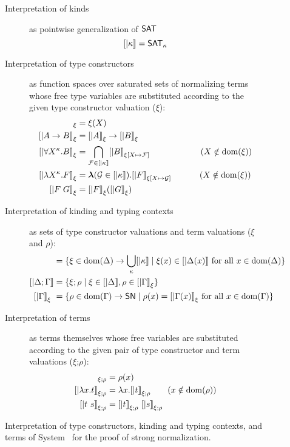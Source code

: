 \begin{figure}
\begin{singlespace}
\begin{description}
\item[Interpretation of kinds] as pointwise generalization of $\mathsf{SAT}$
        \[ [| \kappa |] = \mathsf{SAT}_\kappa \]
\item[Interpretation of type constructors]
        as function spaces over saturated sets of normalizing terms
        whose free type variables are substituted according to
        the given type constructor valuation ($\xi$):
\begin{align*}
[| X |]_\xi      &= \xi(X) \\ 
[| A -> B |]_\xi &= [|A|]_\xi -> [|B|]_\xi \\
[| \forall X^\kappa . B |]_\xi
        &= \bigcap_{\mathcal{F}\in[|\kappa|]} [|B|]_{\xi[X\mapsto\mathcal{F}]}
                \qquad\qquad\qquad (X\notin\dom(\xi)) \\
[| \l X^\kappa . F |]_\xi
        &= \bbl(\mathcal{G} \in [|\kappa|]) . [|F|]_{\xi[X\mapsto\mathcal{G}]}
                \qquad\quad~ (X\notin\dom(\xi)) \\
[| F \; G |]_\xi &= [|F|]_\xi ( [|G|]_\xi )
\end{align*}
\item[Interpretation of kinding and typing contexts]
        as sets of type constructor valuations and term valuations
        ($\xi$ and $\rho$):
\begin{align*}
[| \Delta        |] &= \{ \xi \in \dom(\Delta) -> \bigcup_{\kappa} [|\kappa|] \mid \xi(x)\in[|\Delta(x)|] ~\text{for all}~x\in\dom(\Delta) \} \\
[| \Delta;\Gamma |] &= \{ \xi;\rho \mid \xi\in[|\Delta|], \rho\in[|\Gamma|]_\xi \} \\
[| \Gamma        |]_\xi\ &= \{ \rho \in \dom(\Gamma) -> \SN \mid \rho(x)=[|\Gamma(x)|]_\xi ~\text{for all}~x\in\dom(\Gamma) \}
\end{align*}
\item[Interpretation of terms]
        as terms themselves whose free variables are substituted according to
        the given pair of type constructor and term valuations
        ($\xi$;$\rho$):
\begin{align*}
[| x      |]_{\xi;\rho} &= \rho(x) \\
[| \l x.t |]_{\xi;\rho} &= \l x . [|t|]_{\xi;\rho} \qquad (x\notin\dom(\rho)) \\
[| t ~ s  |]_{\xi;\rho} &= [| t |]_{\xi;\rho} ~ [| s |]_{\xi;\rho}
\end{align*}
\end{description}
\caption[Interpretation of System \Fw\ for proving strong normalization]
        {Interpretation of type constructors, kinding and typing contexts,
                and terms of System \Fw\ for the proof of strong normalization.}
\label{fig:interpFw}
\end{singlespace}
\end{figure}

